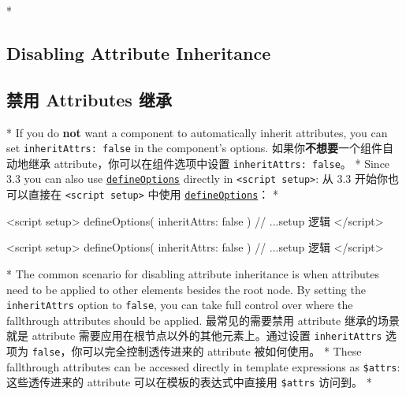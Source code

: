 \begin{paracol}{2}

\switchcolumn[0]*%
\subsection{Disabling Attribute Inheritance}
\switchcolumn
\subsection{禁用 Attributes 继承}
\switchcolumn[0]*%
If you do \textbf{not} want a component to automatically inherit
attributes, you can set \texttt{inheritAttrs:\ false} in the component's
options.
\switchcolumn
如果你\textbf{不想要}一个组件自动地继承
attribute，你可以在组件选项中设置 \texttt{inheritAttrs:\ false}。
\switchcolumn[0]*%
Since 3.3 you can also use
\href{https://vuejs.org/api/sfc-script-setup.html\#defineoptions}{\texttt{defineOptions}}
directly in \texttt{\textless{}script\ setup\textgreater{}}:
\switchcolumn
从 3.3 开始你也可以直接在
\texttt{\textless{}script\ setup\textgreater{}} 中使用
\href{https://cn.vuejs.org/api/sfc-script-setup.html\#defineoptions}{\texttt{defineOptions}}：
\switchcolumn[0]*%
\begin{codeHtml}
<script setup>
defineOptions({
    inheritAttrs: false
})
// ...setup 逻辑
</script>
\end{codeHtml}
\switchcolumn
\begin{codeHtml}
<script setup>
defineOptions({
    inheritAttrs: false
})
// ...setup 逻辑
</script>
\end{codeHtml}
\switchcolumn[0]*%
The common scenario for disabling attribute inheritance is when
attributes need to be applied to other elements besides the root node.
By setting the \texttt{inheritAttrs} option to \texttt{false}, you can
take full control over where the fallthrough attributes should be
applied.
\switchcolumn
最常见的需要禁用 attribute 继承的场景就是 attribute
需要应用在根节点以外的其他元素上。通过设置 \texttt{inheritAttrs} 选项为
\texttt{false}，你可以完全控制透传进来的 attribute 被如何使用。
\switchcolumn[0]*%
These fallthrough attributes can be accessed directly in template
expressions as \texttt{\$attrs}:
\switchcolumn
这些透传进来的 attribute 可以在模板的表达式中直接用 \texttt{\$attrs}
访问到。
\switchcolumn[0]*%
\switchcolumn
\begin{codeHtml}

\end{codeHtml}
\end{paracol}
